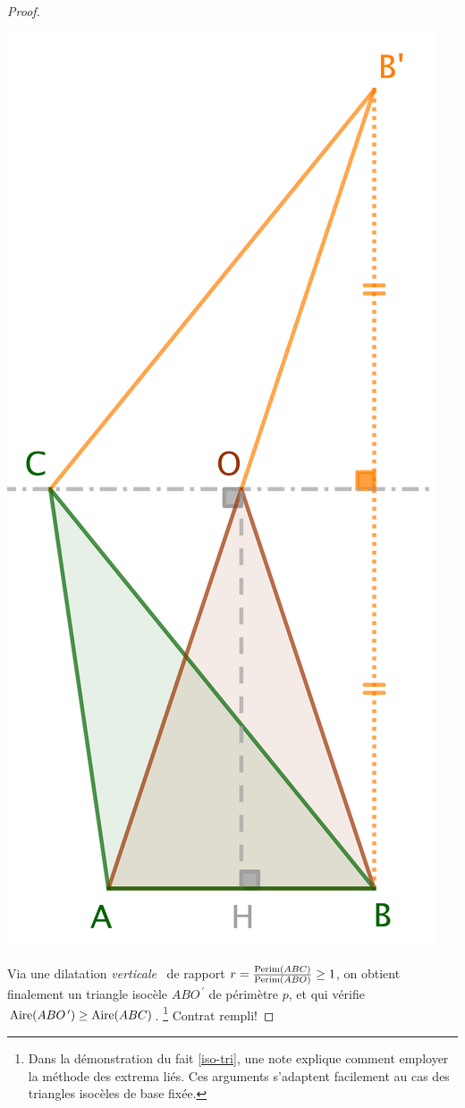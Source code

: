 \begin{proof}
	\begin{center}
		\includegraphics[scale=.4]{content/triangle-one-side-fixed/triangle-proof.png}
	\end{center}
	
	Via une dilatation \og \emph{verticale} \fg\ de rapport $r = \frac{\mathrm{Perim}(ABC)}{\mathrm{Perim}(ABO)} \geq 1$, on obtient finalement un triangle isocèle $ABO^{\,\prime}$ de périmètre $p$, et qui vérifie $\mathrm{Aire}(ABO^{\,\prime}) \geq \mathrm{Aire}(ABC)$.
	\footnote{
		Dans la démonstration du fait \ref{iso-tri}, une note explique comment employer la méthode des extrema liés. 
		Ces arguments s'adaptent facilement au cas des triangles isocèles de base fixée.
	}
	Contrat rempli!
\end{proof}